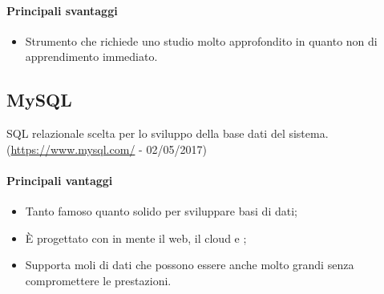 \documentclass[../PianoDiQualifica.tex]{subfiles}
\begin{document}
			\paragraph{Principali svantaggi}
				\begin{itemize}
					\item Strumento che richiede uno studio molto approfondito in quanto non di apprendimento immediato.
				\end{itemize}
		\subsection{MySQL}
			 SQL relazionale scelta per lo sviluppo della base dati del sistema.\\
			(\url{https://www.mysql.com/} - 02/05/2017) 
			\paragraph{Principali vantaggi}
			\begin{itemize}
					\item Tanto famoso quanto solido per sviluppare basi di dati;
					\item È progettato con in mente il web, il cloud e ;
					\item Supporta moli di dati che possono essere anche molto grandi senza compromettere le prestazioni.
				\end{itemize}
\end{document}
